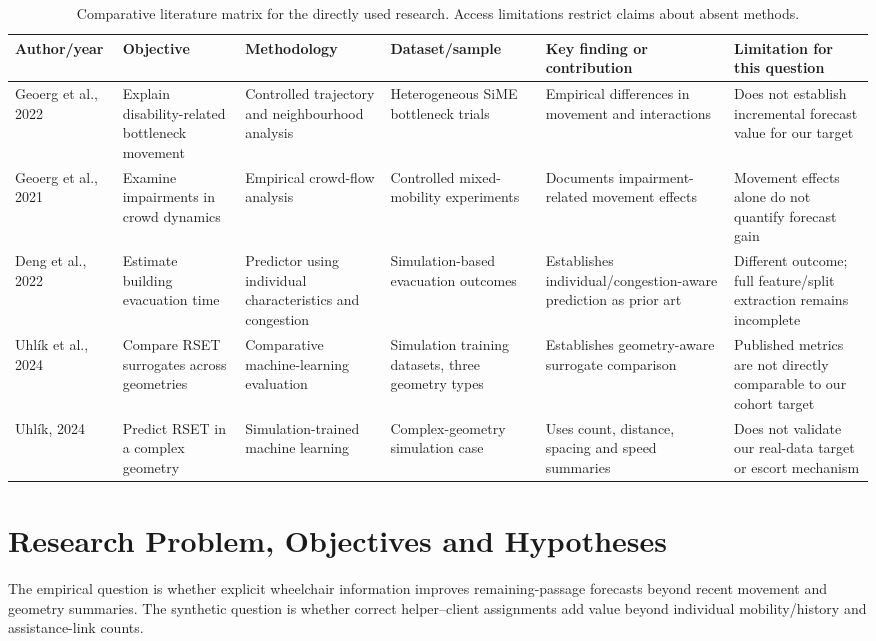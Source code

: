 \documentclass[conference]{IEEEtran}
\begin{document}
\begin{table}[t]
\caption{Comparative literature matrix for the directly used research. Access limitations restrict claims about absent methods.}\label{tab:literature}
\centering\footnotesize\setlength{\tabcolsep}{4pt}
\begin{tabular}{>{\raggedright\arraybackslash}p{}>{\raggedright\arraybackslash}p{}>{\raggedright\arraybackslash}p{}>{\raggedright\arraybackslash}p{}>{\raggedright\arraybackslash}p{}>{\raggedright\arraybackslash}p{}}
\toprule Author/year & Objective & Methodology & Dataset/sample & Key finding or contribution & Limitation for this question\\\midrule
Geoerg et al., 2022~\cite{sime} & Explain disability-related bottleneck movement & Controlled trajectory and neighbourhood analysis & Heterogeneous SiME bottleneck trials & Empirical differences in movement and interactions & Does not establish incremental forecast value for our target\\
Geoerg et al., 2021~\cite{geoerg} & Examine impairments in crowd dynamics & Empirical crowd-flow analysis & Controlled mixed-mobility experiments & Documents impairment-related movement effects & Movement effects alone do not quantify forecast gain\\
Deng et al., 2022~\cite{deng} & Estimate building evacuation time & Predictor using individual characteristics and congestion & Simulation-based evacuation outcomes & Establishes individual/congestion-aware prediction as prior art & Different outcome; full feature/split extraction remains incomplete\\
Uhl\'{i}k et al., 2024~\cite{rset} & Compare RSET surrogates across geometries & Comparative machine-learning evaluation & Simulation training datasets, three geometry types & Establishes geometry-aware surrogate comparison & Published metrics are not directly comparable to our cohort target\\
Uhl\'{i}k, 2024~\cite{femtc} & Predict RSET in a complex geometry & Simulation-trained machine learning & Complex-geometry simulation case & Uses count, distance, spacing and speed summaries & Does not validate our real-data target or escort mechanism\\\bottomrule
\end{tabular}
\end{table}

\section{Research Problem, Objectives and Hypotheses}
The empirical question is whether explicit wheelchair information improves remaining-passage forecasts beyond recent movement and geometry summaries. The synthetic question is whether correct helper--client assignments add value beyond individual mobility/history and assistance-link counts.
\end{document}

